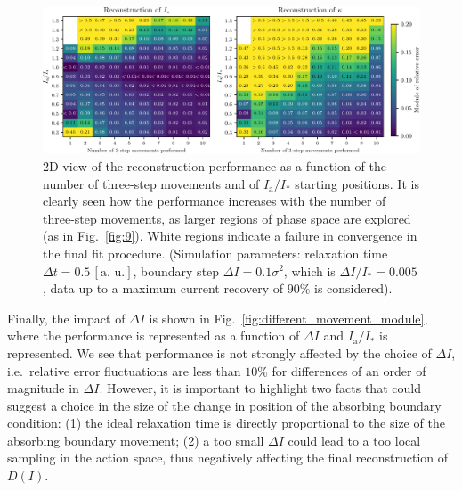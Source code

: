 {\begin{figure}[htp]
    \centering
    \includegraphics[width=\textwidth]{4_probing_the_diffusive_behavior/figs/final/MULTI_different_samples.pdf}
    \caption{2D view of the reconstruction performance as a function of the number of three-step movements and of $I_\mathrm{a}/I_\ast$ starting positions. It is clearly seen how the performance increases with the number of three-step movements, as larger regions of phase space are explored (as in Fig.~\ref{fig:9}). White regions indicate a failure in convergence in the final fit procedure. (Simulation parameters: relaxation time $\Delta t=0.5 \, [\text{a. u.}]$, boundary step $\Delta I=0.1 \sigma^2$, which is $\Delta I / I_\ast = 0.005$, data up to a maximum current recovery of $90\%$ is considered).}
    \label{fig:different_nsamples}
\end{figure}

Finally, the impact of $\Delta I$ is shown in Fig.~\ref{fig:different_movement_module}, where the performance is represented as a function of $\Delta I$ and $I_\mathrm{a}/I_\ast$ is represented.  We see that performance is not strongly affected by the choice of $\Delta I$, i.e.\ relative error fluctuations are less than $10\%$ for differences of an order of magnitude in $\Delta I$. However, it is important to highlight two facts that could suggest a choice in the size of the change in position of the absorbing boundary condition: (1) the ideal relaxation time is directly proportional to the size of the absorbing boundary movement; (2) a too small $\Delta I$ could lead to a too local sampling in the action space, thus negatively affecting the final reconstruction of $D(I)$. 

}
